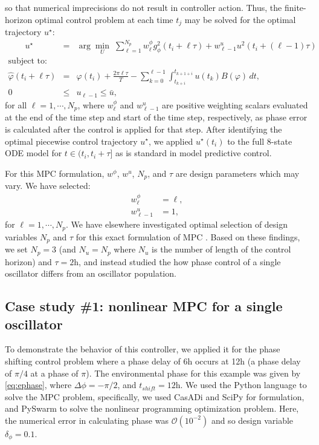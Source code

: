 so that numerical imprecisions do not result in controller action.
Thus, the finite-horizon optimal control problem at each time $t_j$ may be solved for the optimal trajectory $u^\star$:
\begin{eqnarray}
        \nonumber \qquad u^\star &=& \arg\min_{U} \;\sum_{\ell=1}^{N_p} w^\phi_{\ell}g^2_{\phi}(t_i+\ell\tau) + w^u_{\ell-1}u^2(t_i+(\ell-1)\tau)\\
        \nonumber \text{subject to:}&&\\
        \label{eq:mpcoptim}   \hat\varphi(t_i+\ell\tau) &=& \varphi(t_i) + \frac{2\pi\ell\tau}{T}-\sum_{k=0}^{\ell-1} \int_{t_{k+i}}^{t_{k+1+i}}u(t_k)B(\varphi)\, dt,\\
     \nonumber  0 &\le& u_{\ell-1}\le \bar u, 
    \end{eqnarray}
for all $\ell=1, \cdots,N_p$, where $w^\phi_{\ell}$ and $w^u_{\ell-1}$ are positive weighting scalars evaluated at the end of the time step and start of the time step, respectively, as phase error is calculated after the control is applied for that step.
After identifying the optimal piecewise control trajectory $u^\star$, we applied $u^\star(t_i)$ to the full 8-state ODE model for $t \in (t_i, t_i+\tau]$ as is standard in model predictive control.

For this MPC formulation, $w^\phi$, $w^u$, $N_p$, and $\tau$ are design parameters which may vary.
We have selected:
\begin{align*}
w^\phi_{\ell} &= \ell,\\
w^u_{\ell-1} & = 1,
\end{align*}
for $ \ell=1,\cdots, N_p$.
We have elsewhere investigated optimal selection of design variables $N_p$ and $\tau$ for this exact formulation of MPC \cite{Abel2017a}. 
Based on these findings, we set $N_p=3$ (and $N_u=N_p$ where $N_u$ is the number of length of the control horizon) and $\tau=2$h, and instead studied the how phase control of a single oscillator differs from an oscillator population.




\subsection*{Case study \#1: nonlinear MPC for a single oscillator\label{ssec:applysc}}

To demonstrate the behavior of this controller, we applied it for the phase shifting control problem where a phase delay of 6h occurs at 12h (a phase delay of $\pi/4$ at a phase of $\pi$).
The environmental phase for this example was given by \ref{eq:ephase}, where $\Delta \phi=-\pi/2$, and $t_{shift} =12$h.
We used the Python language to solve the MPC problem, specifically, we used CasADi \cite{Andersson2012} and SciPy for formulation, and PySwarm to solve the nonlinear programming optimization problem.
Here, the numerical error in calculating phase was $\mathcal O(10^{-2})$ and so design variable $\delta_\phi = 0.1$.

